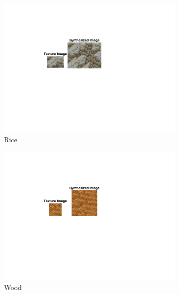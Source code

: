 \documentclass[10pt,twocolumn,letterpaper]{article}
\begin{document}
\begin{figure}
\begin{subfigure}[h]{0.33\textwidth}
        \centering
        \includegraphics[trim={4.5cm 7cm 8.0cm 3cm}, clip, scale=1.5, width=\textwidth]{../results/syn_final/result_rice_B_40.png}
        \caption{Rice}
        \label{fig:apple_res}
    \end{subfigure}
    \begin{subfigure}[h]{0.33\textwidth}
        \centering
        \includegraphics[trim={4.5cm 7cm 8.0cm 3cm}, clip, scale=1.5, width=\textwidth]{../results/syn_final/result_wood_c_B_40.png}
        \caption{Wood}
        \label{fig:apple_res}
    \end{subfigure}
    \hfill
    \begin{subfigure}[h]{0.33\textwidth}
       \centering

\end{subfigure}
\end{figure}
\end{document}
